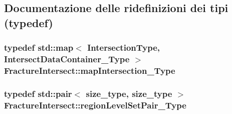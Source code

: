 \subsection{Documentazione delle ridefinizioni dei tipi (typedef)}
\hypertarget{classFractureIntersect_a4eea7d0aca48cdd36ea1756e75280332}{
\subsubsection[{map\-Intersection\-\_\-\-Type}]{\setlength{\rightskip}{0pt plus 5cm}typedef std\-::map$<$ {\bf Intersection\-Type}, {\bf Intersect\-Data\-Container\-\_\-\-Type} $>$ {\bf Fracture\-Intersect\-::map\-Intersection\-\_\-\-Type}}}\label{classFractureIntersect_a4eea7d0aca48cdd36ea1756e75280332}
\hypertarget{classFractureIntersect_aea039e89cb4b4314c25c7a362641f40e}{
\subsubsection[{region\-Level\-Set\-Pair\-\_\-\-Type}]{\setlength{\rightskip}{0pt plus 5cm}typedef std\-::pair$<$ size\-\_\-type, size\-\_\-type $>$ {\bf Fracture\-Intersect\-::region\-Level\-Set\-Pair\-\_\-\-Type}}}\label{classFractureIntersect_aea039e89cb4b4314c25c7a362641f40e}


